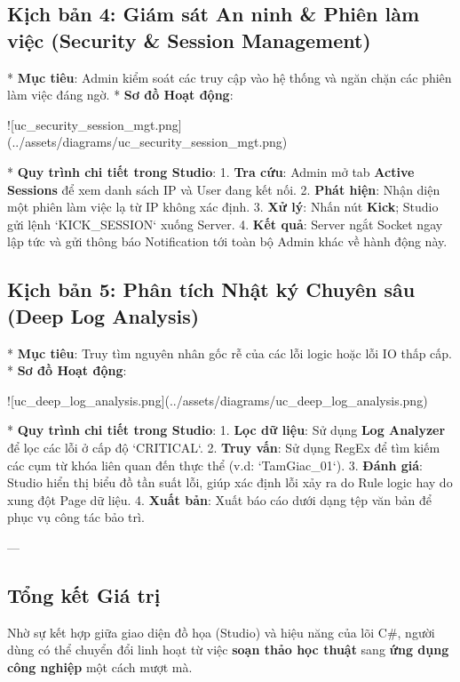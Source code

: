\subsection{Kịch bản 4: Giám sát An ninh & Phiên làm việc (Security & Session Management)}

*   \textbf{Mục tiêu}: Admin kiểm soát các truy cập vào hệ thống và ngăn chặn các phiên làm việc đáng ngờ.
*   \textbf{Sơ đồ Hoạt động}:

![uc\_security\_session\_mgt.png](../assets/diagrams/uc\_security\_session\_mgt.png)

*   \textbf{Quy trình chi tiết trong Studio}:
    1.  \textbf{Tra cứu}: Admin mở tab \textbf{Active Sessions} để xem danh sách IP và User đang kết nối.
    2.  \textbf{Phát hiện}: Nhận diện một phiên làm việc lạ từ IP không xác định.
    3.  \textbf{Xử lý}: Nhấn nút \textbf{Kick}; Studio gửi lệnh `KICK\_SESSION` xuống Server.
    4.  \textbf{Kết quả}: Server ngắt Socket ngay lập tức và gửi thông báo Notification tới toàn bộ Admin khác về hành động này.

\subsection{Kịch bản 5: Phân tích Nhật ký Chuyên sâu (Deep Log Analysis)}

*   \textbf{Mục tiêu}: Truy tìm nguyên nhân gốc rễ của các lỗi logic hoặc lỗi IO thấp cấp.
*   \textbf{Sơ đồ Hoạt động}:

![uc\_deep\_log\_analysis.png](../assets/diagrams/uc\_deep\_log\_analysis.png)

*   \textbf{Quy trình chi tiết trong Studio}:
    1.  \textbf{Lọc dữ liệu}: Sử dụng \textbf{Log Analyzer} để lọc các lỗi ở cấp độ `CRITICAL`.
    2.  \textbf{Truy vấn}: Sử dụng RegEx để tìm kiếm các cụm từ khóa liên quan đến thực thể (v.d: `TamGiac\_01`).
    3.  \textbf{Đánh giá}: Studio hiển thị biểu đồ tần suất lỗi, giúp xác định lỗi xảy ra do Rule logic hay do xung đột Page dữ liệu.
    4.  \textbf{Xuất bản}: Xuất báo cáo dưới dạng tệp văn bản để phục vụ công tác bảo trì.

---

\subsection{Tổng kết Giá trị}

Nhờ sự kết hợp giữa giao diện đồ họa (Studio) và hiệu năng của lõi C\#, người dùng có thể chuyển đổi linh hoạt từ việc \textbf{soạn thảo học thuật} sang \textbf{ứng dụng công nghiệp} một cách mượt mà.

